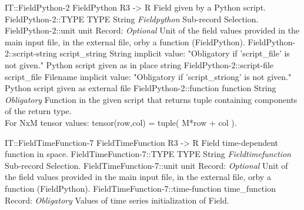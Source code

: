 \begin{RecordType}
	{IT::FieldPython-2}
	{FieldPython}
	{} %
	{} %
	{{{R3 -{\textgreater} R Field given by a Python script.}}}
		\RecKey
			{FieldPython-2::TYPE}
			{TYPE}
			{{String}}
			{ \it{Fieldpython} }
			{{{Sub-record Selection.}}}
		\RecKey
			{FieldPython-2::unit}
			{unit}
			{{Record}{: }}
			{ \it{Optional} }
			{{{Unit of the field values provided in the main input file, in the external file, orby a function (FieldPython).}}}
		\RecKey
			{FieldPython-2::script-string}
			{script{\_}string}
			{{String}}
			{implicit value: "{Obligatory if 'script{\_}file' is not given.}"}
			{{{Python script given as in place string}}}
		\RecKey
			{FieldPython-2::script-file}
			{script{\_}file}
			{{Filename}}
			{implicit value: "{Obligatory if 'script{\_}striong' is not given.}"}
			{{{Python script given as external file}}}
		\RecKey
			{FieldPython-2::function}
			{function}
			{{String}}
			{ \it{Obligatory} }
			{{{Function in the given script that returns tuple containing components of the return type.}\\{
For NxM tensor values: tensor(row,col) = tuple( M*row + col ).}}}
\end{RecordType}
\begin{RecordType}
	{IT::FieldTimeFunction-7}
	{FieldTimeFunction}
	{} %
	{} %
	{{{R3 -{\textgreater} R Field time-dependent function in space.}}}
		\RecKey
			{FieldTimeFunction-7::TYPE}
			{TYPE}
			{{String}}
			{ \it{Fieldtimefunction} }
			{{{Sub-record Selection.}}}
		\RecKey
			{FieldTimeFunction-7::unit}
			{unit}
			{{Record}{: }}
			{ \it{Optional} }
			{{{Unit of the field values provided in the main input file, in the external file, orby a function (FieldPython).}}}
		\RecKey
			{FieldTimeFunction-7::time-function}
			{time{\_}function}
			{{Record}{: }}
			{ \it{Obligatory} }
			{{{Values of time series initialization of Field.}}}
\end{RecordType}
